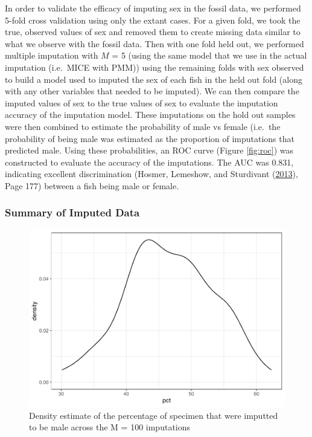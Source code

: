 \documentclass[
  12pt,
]{article}
\begin{document}
In order to validate the efficacy of imputing sex in the fossil data, we
performed 5-fold cross validation using only the extant cases. For a
given fold, we took the true, observed values of sex and removed them to
create missing data similar to what we observe with the fossil data.
Then with one fold held out, we performed multiple imputation with \(M\)
= 5 (using the same model that we use in the actual imputation
(i.e.~MICE with PMM)) using the remaining folds with sex observed to
build a model used to imputed the sex of each fish in the held out fold
(along with any other variables that needed to be imputed). We can then
compare the imputed values of sex to the true values of sex to evaluate
the imputation accuracy of the imputation model. These imputations on
the hold out samples were then combined to estimate the probability of
male vs female (i.e.~the probability of being male was estimated as the
proportion of imputations that predicted male. Using these
probabilities, an ROC curve (Figure \ref{fig:roc}) was constructed to
evaluate the accuracy of the imputations. The AUC was 0.831, indicating
excellent discrimination (Hosmer, Lemeshow, and Sturdivant
(\protect\hyperlink{ref-HosmerLemeshow}{2013}), Page 177) between a fish
being male or female.

\hypertarget{summary-of-imputed-data}{%
\subsubsection{Summary of Imputed Data}\label{summary-of-imputed-data}}

\begin{figure}

{\centering \includegraphics{paper_files/figure-latex/est-p-1} 

}

\caption{Density estimate of the percentage of specimen that were imputted to be male across the M = 100 imputations}\label{fig:est-p}
\end{figure}
\end{document}
